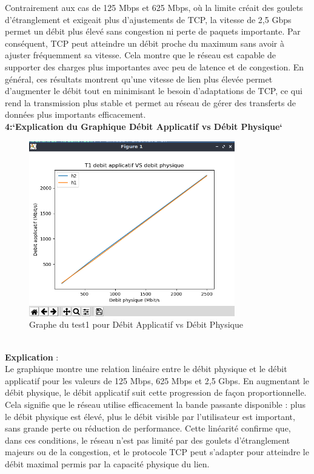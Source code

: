 Contrairement aux cas de 125 Mbps et 625 Mbps, où la limite créait des goulets d’étranglement et exigeait plus d’ajustements de TCP, la vitesse de 2,5 Gbps permet un débit plus élevé sans congestion ni perte de paquets importante. Par conséquent, TCP peut atteindre un débit proche du maximum sans avoir à ajuster fréquemment sa vitesse. Cela montre que le réseau est capable de supporter des charges plus importantes avec peu de latence et de congestion. En général, ces résultats montrent qu’une vitesse de lien plus élevée permet d’augmenter le débit tout en minimisant le besoin d’adaptations de TCP, ce qui rend la transmission plus stable et permet au réseau de gérer des transferts de données plus importants efficacement.
\\
\newpage
\textbf{4:`Explication du Graphique Débit Applicatif vs Débit Physique`}
\begin{figure}[H]
    \centering
    \includegraphics[width=0.8\textwidth]{./images/T1.1/T1appVSphy.png}
    \caption{Graphe du test1 pour Débit Applicatif vs Débit Physique}
    \label{fig:exemple}
\end{figure}
\\
\textbf{Explication} :\\
Le graphique montre une relation linéaire entre le débit physique et le débit applicatif pour les valeurs de 125 Mbps, 625 Mbps et 2,5 Gbps. En augmentant le débit physique, le débit applicatif suit cette progression de façon proportionnelle. Cela signifie que le réseau utilise efficacement la bande passante disponible : plus le débit physique est élevé, plus le débit visible par l’utilisateur est important, sans grande perte ou réduction de performance. Cette linéarité confirme que, dans ces conditions, le réseau n’est pas limité par des goulets d'étranglement majeurs ou de la congestion, et le protocole TCP peut s’adapter pour atteindre le débit maximal permis par la capacité physique du lien.

